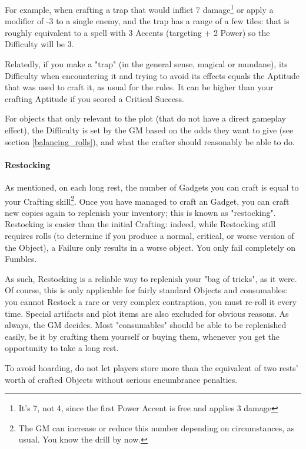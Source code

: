 For example, when crafting a trap that would inflict 7 damage\footnote{It's 7, not 4, since the first Power Accent is free and applies 3 damage} or apply a modifier of -3 to a single enemy, and the trap has a range of a few tiles: that is roughly equivalent to a spell with 3 Accents (targeting + 2 Power) so the Difficulty will be 3.

Relatedly, if you make a "trap" (in the general sense, magical or mundane), its Difficulty when encountering it and trying to avoid its effects equals the Aptitude that was used to craft it, as usual for the rules. It can be higher than your crafting Aptitude if you scored a Critical Success. 

For objects that only relevant to the plot (that do not have a direct gameplay effect), the Difficulty is set by the GM based on the odds they want to give (see section \ref{balancing_rolls}), and what the crafter should reasonably be able to do. 

\paragraph{Restocking}

As mentioned, on each long rest, the number of Gadgets you can craft is equal to your Crafting skill\footnote{The GM can increase or reduce this number depending on circumstances, as usual. You know the drill by now.}. Once you have managed to craft an Gadget, you can craft new copies again to replenish your inventory; this is known as "restocking". Restocking is easier than the initial Crafting: indeed, while Restocking still requires rolls (to determine if you produce a normal, critical, or worse version of the Object), a Failure only results in a worse object. You only fail completely on Fumbles.

As such, Restocking is a reliable way to replenish your "bag of tricks", as it were. Of course, this is only applicable for fairly standard Objects and consumables: you cannot Restock a rare or very complex contraption, you must re-roll it every time. Special artifacts and plot items are also excluded for obvious reasons. As always, the GM decides. Most "consumables" should be able to be replenished easily, be it by crafting them yourself or buying them, whenever you get the opportunity to take a long rest. 

To avoid hoarding, do not let players store more than the equivalent of two rests' worth of crafted Objects without serious encumbrance penalties.

